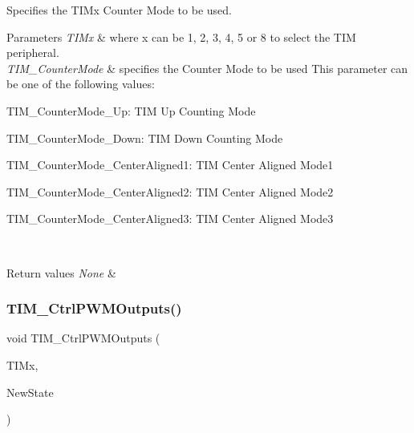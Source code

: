 Specifies the T\+I\+Mx Counter Mode to be used. 


\begin{DoxyParams}{Parameters}
{\em T\+I\+Mx} & where x can be 1, 2, 3, 4, 5 or 8 to select the T\+IM peripheral. \\
\hline
{\em T\+I\+M\+\_\+\+Counter\+Mode} & specifies the Counter Mode to be used This parameter can be one of the following values\+: \begin{DoxyItemize}
\item T\+I\+M\+\_\+\+Counter\+Mode\+\_\+\+Up\+: T\+IM Up Counting Mode \item T\+I\+M\+\_\+\+Counter\+Mode\+\_\+\+Down\+: T\+IM Down Counting Mode \item T\+I\+M\+\_\+\+Counter\+Mode\+\_\+\+Center\+Aligned1\+: T\+IM Center Aligned Mode1 \item T\+I\+M\+\_\+\+Counter\+Mode\+\_\+\+Center\+Aligned2\+: T\+IM Center Aligned Mode2 \item T\+I\+M\+\_\+\+Counter\+Mode\+\_\+\+Center\+Aligned3\+: T\+IM Center Aligned Mode3 \end{DoxyItemize}
\\
\hline
\end{DoxyParams}

\begin{DoxyRetVals}{Return values}
{\em None} & \\
\hline
\end{DoxyRetVals}
\mbox{\label{group___t_i_m___private___functions_ga3e59ebced2ab8e0b817c460f1670e97d}} 
\subsubsection{\texorpdfstring{TIM\_CtrlPWMOutputs()}{TIM\_CtrlPWMOutputs()}}
{\footnotesize\ttfamily void T\+I\+M\+\_\+\+Ctrl\+P\+W\+M\+Outputs (\begin{DoxyParamCaption}\item[{\mbox{\hyperlink{struct_t_i_m___type_def}{T\+I\+M\+\_\+\+Type\+Def}} $\ast$}]{T\+I\+Mx,  }\item[{\mbox{\hyperlink{group___exported__types_gac9a7e9a35d2513ec15c3b537aaa4fba1}{Functional\+State}}}]{New\+State }\end{DoxyParamCaption})}




